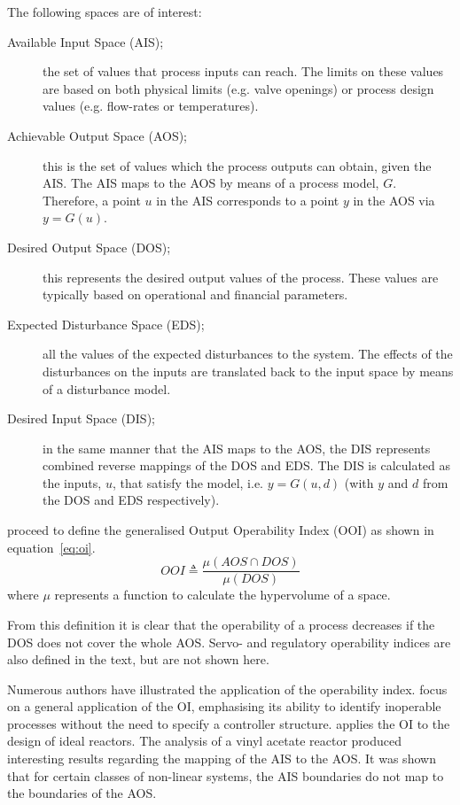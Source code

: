 \documentclass[final,authoryear,5pt,times,twocolumn]{elsarticle}
\begin{document}
The following spaces are of interest:
\begin{description}
  \item [Available Input Space (AIS);] the set of values that process      inputs can reach. 
The limits on these values are based on both physical limits (e.g.     valve openings) or process design values (e.g. flow-rates or temperatures). 
  \item [Achievable Output Space (AOS);] this is the set of values which the process outputs can obtain, given the AIS. 
The AIS maps to the AOS by means of a process model, $G$. 
Therefore, a point $u$ in the AIS corresponds to a point $y$ in the AOS via $y=G(u)$. 
  \item [Desired Output Space (DOS);] this represents the desired output values of the process. 
These values are typically based on operational and financial   parameters. 
  \item [Expected Disturbance Space (EDS);] all the values of the expected disturbances to the system. 
The effects of the disturbances on the inputs are translated back to the input space by means of a disturbance model.
  \item [Desired Input Space (DIS);] in the same manner that the AIS maps to the AOS, the DIS represents combined reverse mappings of the DOS and EDS.
The DIS is calculated as the inputs, $u$, that satisfy the model, i.e. $y=G(u,d)$ (with $y$ and $d$ from the DOS and EDS respectively).
\end{description}

\citet{vinsonartoi} proceed to define the generalised Output Operability Index (OOI) as shown in equation~\ref{eq:oi}. 
\begin{equation}
  \label{eq:oi}
     OOI \triangleq \frac{\mu(AOS\cap DOS)}{\mu(DOS)}
\end{equation}
where $\mu$ represents a function to calculate the hypervolume of a space.

From this definition it is clear that the operability of a process decreases if the DOS does not cover the whole AOS. 
Servo- and regulatory operability indices are also defined in the text, but are not shown here.

Numerous authors have illustrated the application of the operability index. 
\citet{opconproc} focus on a general application of the OI, emphasising its ability to identify inoperable processes without the need to specify a controller structure. 
\citet{opidealrx} applies the OI to the design of ideal reactors. 
The analysis of a vinyl acetate reactor produced interesting results
regarding the mapping of the AIS to the AOS. 
It was shown that for certain classes of non-linear systems, the AIS boundaries do not map to the boundaries of the AOS.
\end{document}
